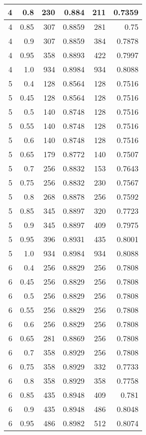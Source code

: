 \begin{center}
\begin{longtable}{|r|r|r|r|r|r|}
\hline
4 & 0.8 & 230 & 0.884 & 211 & 0.7359 \\
\hline
4 & 0.85 & 307 & 0.8859 & 281 & 0.75 \\
\hline
4 & 0.9 & 307 & 0.8859 & 384 & 0.7878 \\
\hline
4 & 0.95 & 358 & 0.8893 & 422 & 0.7997 \\
\hline
4 & 1.0 & 934 & 0.8984 & 934 & 0.8088 \\
\hline
5 & 0.4 & 128 & 0.8564 & 128 & 0.7516 \\
\hline
5 & 0.45 & 128 & 0.8564 & 128 & 0.7516 \\
\hline
5 & 0.5 & 140 & 0.8748 & 128 & 0.7516 \\
\hline
5 & 0.55 & 140 & 0.8748 & 128 & 0.7516 \\
\hline
5 & 0.6 & 140 & 0.8748 & 128 & 0.7516 \\
\hline
5 & 0.65 & 179 & 0.8772 & 140 & 0.7507 \\
\hline
5 & 0.7 & 256 & 0.8832 & 153 & 0.7643 \\
\hline
5 & 0.75 & 256 & 0.8832 & 230 & 0.7567 \\
\hline
5 & 0.8 & 268 & 0.8878 & 256 & 0.7592 \\
\hline
5 & 0.85 & 345 & 0.8897 & 320 & 0.7723 \\
\hline
5 & 0.9 & 345 & 0.8897 & 409 & 0.7975 \\
\hline
5 & 0.95 & 396 & 0.8931 & 435 & 0.8001 \\
\hline
5 & 1.0 & 934 & 0.8984 & 934 & 0.8088 \\
\hline
6 & 0.4 & 256 & 0.8829 & 256 & 0.7808 \\
\hline
6 & 0.45 & 256 & 0.8829 & 256 & 0.7808 \\
\hline
6 & 0.5 & 256 & 0.8829 & 256 & 0.7808 \\
\hline
6 & 0.55 & 256 & 0.8829 & 256 & 0.7808 \\
\hline
6 & 0.6 & 256 & 0.8829 & 256 & 0.7808 \\
\hline
6 & 0.65 & 281 & 0.8869 & 256 & 0.7808 \\
\hline
6 & 0.7 & 358 & 0.8929 & 256 & 0.7808 \\
\hline
6 & 0.75 & 358 & 0.8929 & 332 & 0.7733 \\
\hline
6 & 0.8 & 358 & 0.8929 & 358 & 0.7758 \\
\hline
6 & 0.85 & 435 & 0.8948 & 409 & 0.781 \\
\hline
6 & 0.9 & 435 & 0.8948 & 486 & 0.8048 \\
\hline
6 & 0.95 & 486 & 0.8982 & 512 & 0.8074 \\

\end{longtable}
\end{center}
